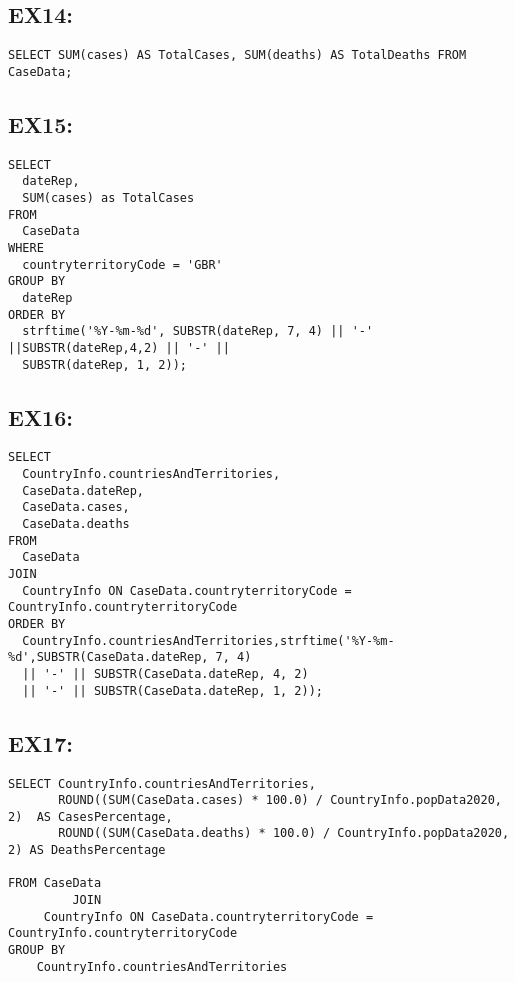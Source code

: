 \documentclass{article}
\begin{document}
\subsection{EX14:}

\begin{verbatim}
SELECT SUM(cases) AS TotalCases, SUM(deaths) AS TotalDeaths FROM CaseData;
\end{verbatim}



\subsection{EX15:}


\begin{verbatim}
SELECT
  dateRep,
  SUM(cases) as TotalCases
FROM
  CaseData
WHERE
  countryterritoryCode = 'GBR' 
GROUP BY
  dateRep
ORDER BY
  strftime('%Y-%m-%d', SUBSTR(dateRep, 7, 4) || '-' ||SUBSTR(dateRep,4,2) || '-' ||
  SUBSTR(dateRep, 1, 2));
\end{verbatim}
\newpage

\subsection{EX16:}

\begin{verbatim}
SELECT
  CountryInfo.countriesAndTerritories,
  CaseData.dateRep,
  CaseData.cases,
  CaseData.deaths
FROM
  CaseData
JOIN
  CountryInfo ON CaseData.countryterritoryCode = CountryInfo.countryterritoryCode
ORDER BY
  CountryInfo.countriesAndTerritories,strftime('%Y-%m-%d',SUBSTR(CaseData.dateRep, 7, 4)
  || '-' || SUBSTR(CaseData.dateRep, 4, 2)
  || '-' || SUBSTR(CaseData.dateRep, 1, 2));
\end{verbatim}

\subsection{EX17:}

\begin{verbatim}
SELECT CountryInfo.countriesAndTerritories,
       ROUND((SUM(CaseData.cases) * 100.0) / CountryInfo.popData2020, 2)  AS CasesPercentage,
       ROUND((SUM(CaseData.deaths) * 100.0) / CountryInfo.popData2020, 2) AS DeathsPercentage

FROM CaseData
         JOIN
     CountryInfo ON CaseData.countryterritoryCode = CountryInfo.countryterritoryCode
GROUP BY
    CountryInfo.countriesAndTerritories
\end{verbatim}
\end{document}
